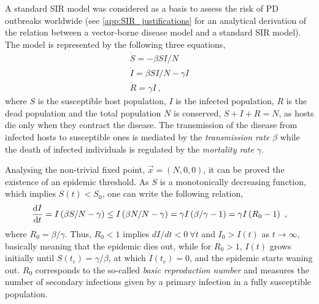 A standard SIR model was considered as a basis to assess the risk of PD
outbreaks worldwide (see \cref{app:SIR_justifications} for an analytical
derivation of the relation between a vector-borne disease model and a standard
SIR model). The model is represented by the following three equations,
\begin{equation}
    \begin{array}{l}
        \dot{S}=-\beta SI/N           \\
        \dot{I}=\beta SI/N - \gamma I \\
        \dot{R}=\gamma I \ ,
    \end{array}
    \label{eq:SIRmodel}
\end{equation}
where $S$ is the susceptible host population, $I$ is the infected
population, $R$ is the dead population and the total population $N$ is
conserved, $S+I+R=N$, as hosts die only when they contract the disease.
The transmission of the disease from infected hosts to susceptible ones is
mediated by the \textit{transmission rate} $\beta$ while the death of infected
individuals is regulated by the \textit{mortality rate} $\gamma$.

Analysing the non-trivial fixed point, $\vec{x}=(N, 0, 0)$, it can be
proved the existence of an epidemic threshold. As $S$ is a monotonically
decreasing function, which implies $S(t)<S_0$, one can write the following
relation,
\begin{equation}\label{eq: threshold_t}
    \frac{\mathrm{d} I}{\mathrm{d} t}=I\left(\beta S/N-\gamma\right)\leq I\left(\beta
        N/N-\gamma\right)=\gamma I\left(\beta/\gamma-1\right)=\gamma
    I\left(R_0-1\right) \ ,
\end{equation}
where $R_0= \beta/\gamma$. Thus, $R_0<1$ implies $dI/dt<0 \ \forall t$ and
$I_0>I(t)$ as $t\to\infty$, basically meaning that the epidemic dies out, while
for $R_0>1$, $I(t)$ grows initially until $S(t_c)=\gamma/\beta$, at which
$\dot{I}(t_c)=0$, and the epidemic starts waning out.
$R_0$ corresponds to the so-called \textit{basic reproduction number} and
measures the number of secondary infections given by a primary infection in a
fully susceptible population.

